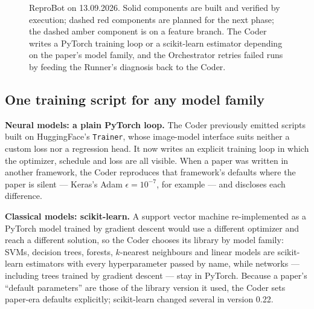 \documentclass[10pt,twocolumn]{article}
\begin{document}
\begin{figure}[tbp]
\caption{ReproBot on 13.09.2026. Solid components are built and verified by execution; dashed
red components are planned for the next phase; the dashed amber component is on a feature
branch. The Coder writes a PyTorch training loop or a scikit-learn estimator depending on the
paper's model family, and the Orchestrator retries failed runs by feeding the Runner's diagnosis
back to the Coder.}
\label{fig:pipeline}
\end{figure}


\subsection{One training script for any model family}

\textbf{Neural models: a plain PyTorch loop.} The Coder previously emitted scripts built on
HuggingFace's \texttt{Trainer}, whose image-model interface suits neither a custom loss nor a
regression head. It now writes an explicit training loop in which the optimizer, schedule and
loss are all visible. When a paper was written in another framework, the Coder reproduces that
framework's defaults where the paper is silent --- Keras's Adam $\epsilon = 10^{-7}$, for
example --- and discloses each difference.

\textbf{Classical models: scikit-learn.} A support vector machine re-implemented as a PyTorch
model trained by gradient descent would use a different optimizer and reach a different
solution, so the Coder chooses its library by model family: SVMs, decision trees, forests,
$k$-nearest neighbours and linear models are scikit-learn estimators with every hyperparameter
passed by name, while networks --- including trees trained by gradient descent --- stay in
PyTorch. Because a paper's ``default parameters'' are those of the library version it used, the
Coder sets paper-era defaults explicitly; scikit-learn changed several in version 0.22.
\end{document}

